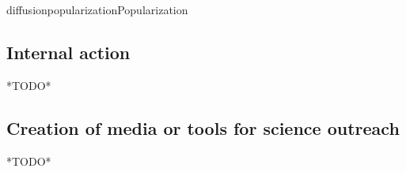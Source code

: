 \documentclass{ra2018}
\begin{document}
\begin{module}{diffusion}{popularization}{Popularization}
\subsection{Internal action}
*TODO*

\subsection{Creation of media or tools for science outreach}
*TODO*

\end{module}



\end{document}

